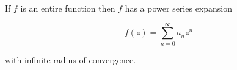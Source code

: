 If $f$ is an entire function then $f$ has a power series expansion

$$f(z) = \sum_{n=0}^{\infty} a_n z^n$$

with infinite radius of convergence.
